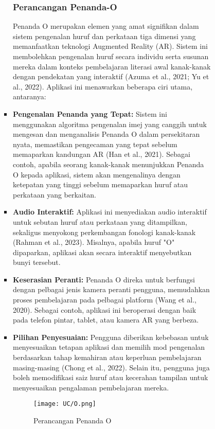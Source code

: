\begin{itemize}
\begin{itemize}
\begin{itemize}
\begin{itemize}
\begin{itemize}
\subsubsection{Perancangan Penanda-O}  
Penanda O merupakan elemen yang amat signifikan dalam sistem pengenalan huruf dan perkataan tiga dimensi yang memanfaatkan teknologi Augmented Reality (AR). Sistem ini membolehkan pengenalan huruf secara individu serta susunan mereka dalam konteks pembelajaran literasi awal kanak-kanak dengan pendekatan yang interaktif (Azuma et al., 2021; Yu et al., 2022). Aplikasi ini menawarkan beberapa ciri utama, antaranya:  \\  

\item \textbf{Pengenalan Penanda yang Tepat:} Sistem ini menggunakan algoritma pengenalan imej yang canggih untuk mengesan dan menganalisis Penanda O dalam persekitaran nyata, memastikan pengecaman yang tepat sebelum memaparkan kandungan AR (Han et al., 2021). Sebagai contoh, apabila seorang kanak-kanak menunjukkan Penanda O kepada aplikasi, sistem akan mengenalinya dengan ketepatan yang tinggi sebelum memaparkan huruf atau perkataan yang berkaitan.\\  
\item \textbf{Audio Interaktif:} Aplikasi ini menyediakan audio interaktif untuk sebutan huruf atau perkataan yang ditampilkan, sekaligus menyokong perkembangan fonologi kanak-kanak (Rahman et al., 2023). Misalnya, apabila huruf "O" dipaparkan, aplikasi akan secara interaktif menyebutkan bunyi tersebut.\\  
\item \textbf{Keserasian Peranti:} Penanda O direka untuk berfungsi dengan pelbagai jenis kamera peranti pengguna, memudahkan proses pembelajaran pada pelbagai platform (Wang et al., 2020). Sebagai contoh, aplikasi ini beroperasi dengan baik pada telefon pintar, tablet, atau kamera AR yang berbeza.\\  
\item \textbf{Pilihan Penyesuaian:} Pengguna diberikan kebebasan untuk menyesuaikan tetapan aplikasi dan memilih mod pengenalan berdasarkan tahap kemahiran atau keperluan pembelajaran masing-masing (Chong et al., 2022). Selain itu, pengguna juga boleh memodifikasi saiz huruf atau kecerahan tampilan untuk menyesuaikan pengalaman pembelajaran mereka. \\ 
  
\begin{figure}
    \centering
    \texttt{[image: UC/O.png]}
    \caption{Perancangan Penanda O}
    \label{fig:enter-label}
\end{figure}





\end{itemize}
\end{itemize}
\end{itemize}
\end{itemize}
\end{itemize}
